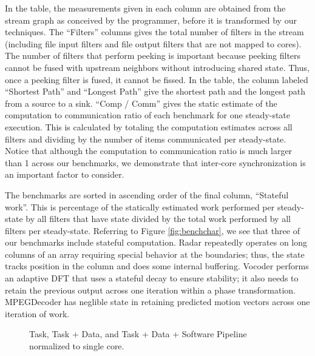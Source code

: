 In the table, the measurements given in each column are obtained from
the stream graph as conceived by the programmer, before it is
transformed by our techniques.  The ``Filters'' columns gives the
total number of filters in the stream (including file input filters
and file output filters that are not mapped to cores).  The number of
filters that perform peeking is important because peeking filters
cannot be fused with upstream neighbors without introducing shared
state.  Thus, once a peeking filter is fused, it cannot be fissed. In
the table, the column labeled ``Shortest Path'' and ``Longest Path''
give the shortest path and the longest path from a source to a
sink. ``Comp / Comm'' gives the static estimate of the computation to
communication ratio of each benchmark for one steady-state
execution. This is calculated by totaling the computation estimates
across all filters and dividing by the number of items communicated
per steady-state. Notice that although the computation to
communication ratio is much larger than 1 across our benchmarks, we
demonstrate that inter-core synchronization is an important factor to
consider.

The benchmarks are sorted in ascending order of the final column,
``Stateful work''. This is percentage of the statically estimated work
performed per steady-state by all filters that have state divided by
the total work performed by all filters per steady-state.  Referring
to Figure \ref{fig:benchchar}, we see that three of our benchmarks
include stateful computation.  Radar repeatedly operates on long
columns of an array requiring special behavior at the boundaries;
thus, the state tracks position in the column and does some internal
buffering.  Vocoder performs an adaptive DFT that uses a stateful
decay to ensure stability; it also needs to retain the previous output
across one iteration within a phase transformation.  MPEGDecoder has
neglible state in retaining predicted motion vectors across one
iteration of work.

\begin{figure*}[t]
\centering
{}
\caption{Task, Task + Data, and Task + Data + Software Pipeline
normalized to single core.
\protect\label{fig:main_comp}}
\vspace{-6pt}
\end{figure*}

